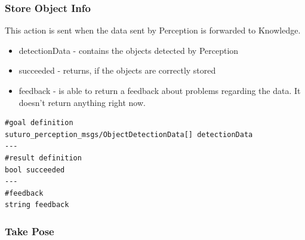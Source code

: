 \documentclass[main.tex]{subfiles}
\begin{document}
					\subsubsection{Store Object Info}
					\label{msg_store_object_info}
						This action is sent when the data sent by Perception is forwarded to Knowledge.
						\begin{itemize}
						\item detectionData - contains the objects detected by Perception
						\item succeeded - returns, if the objects are correctly stored
						\item feedback - is able to return a feedback about problems regarding the data. It doesn't return anything right now.
						\end{itemize}
						\begin{lstlisting}
#goal definition
suturo_perception_msgs/ObjectDetectionData[] detectionData
---
#result definition
bool succeeded
---
#feedback
string feedback
\end{lstlisting}
					\subsubsection{Take Pose}
					\label{msg_take_pose}
\end{document}
